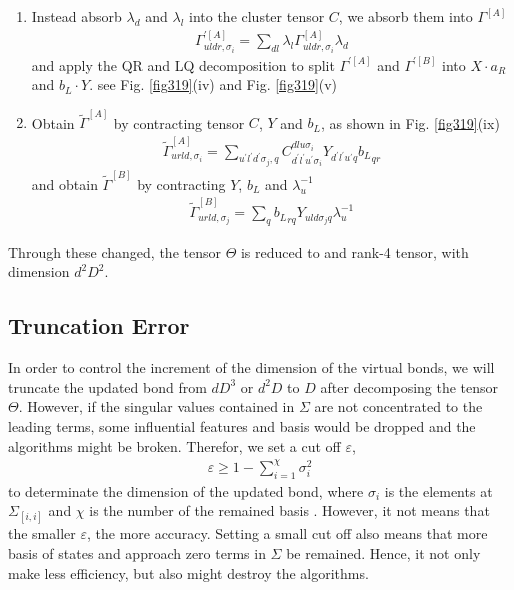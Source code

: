 \begin{enumerate}
	\item Instead absorb $\lambda_d$ and $\lambda_l$ into the cluster tensor $C$, we absorb them into $\Gamma^{[A]}$
		\begin{align}
			\Gamma^{\prime [A]}_{uldr,\sigma_i} = \sum_{dl}{\lambda_l \Gamma^{[A]}_{uldr,\sigma_i} \lambda_d}
		\end{align}
		and apply the QR and LQ decomposition to split $\Gamma^{\prime [A]}$ and $\Gamma^{\prime [B]}$ into $X\cdot a_R$ and $b_L \cdot Y$. see Fig. \ref{fig319}(iv) and Fig. \ref{fig319}(v) 
	\item Obtain $\widetilde{\Gamma}^{[A]}$ by contracting tensor $C$, $Y$ and $b_L$, as shown in Fig. \ref{fig319}(ix)
		\begin{align}
			\widetilde{\Gamma}^{[A]}_{urld, \sigma_i} = \sum_{u^{\prime}l^{\prime}d^{\prime}\sigma_j,q}{C^{dlu\sigma_i}_{d^{\prime}l^{\prime}u^{\prime}\sigma_i}Y_{d^{\prime}l^{\prime}u^{\prime}q}{b_L}_{qr}}
		\end{align}
		and obtain $\widetilde{\Gamma}^{[B]}$ by contracting $Y$, $b_L$ and $\lambda_u^{-1}$
		\begin{align}
			\widetilde{\Gamma}^{[B]}_{urld,\sigma_j} = \sum_{q}{{b_L}_{rq}Y_{uld\sigma_j q}\lambda_u^{-1}}
		\end{align}
\end{enumerate}

Through these changed, the tensor $\Theta$ is reduced to and rank-4 tensor, with dimension $d^2D^2$.

\subsection{Truncation Error}
In order to control the increment of the dimension of the virtual bonds, we will truncate the updated bond from $dD^3$ or $d^2D$ to $D$ after decomposing the tensor $\Theta$. However, if the singular values contained in $\Sigma$ are not concentrated to the leading terms, some influential features and basis would be dropped and the algorithms might be broken. Therefor, we set a cut off $\varepsilon$, 
\begin{align}
	\varepsilon \geq 1 - \sum_{i=1}^{\chi}{\sigma_i^2}
\end{align}
to determinate the dimension of the updated bond, where $\sigma_i$ is the elements at $\Sigma_{[i,i]}$ and $\chi$ is the number of the remained basis . However, it not means that the smaller $\varepsilon$, the more accuracy.  Setting a small cut off also means that more basis of states and approach zero terms in $\Sigma$ be remained. Hence, it not only make less efficiency, but also might destroy the algorithms.



